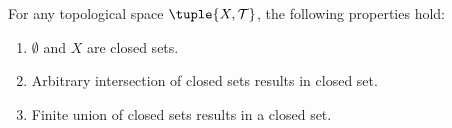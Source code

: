 \begin{thm}
     \label{thm:topological-space-properties-of-closed-sets}
    For any topological space \( \tuple{X, \mathcal{T}} \), the following properties hold:
    \begin{enumerate}[topsep=2pt,label=\textup{\texttt{(\alph*)}}]
        \item \( \emptyset \) and \( X \) are closed sets.  \label{enum:topological-space-properties-of-closed-sets-empty-and-X-are-closed}
        \item Arbitrary intersection of closed sets results in closed set.  \label{enum:topological-space-properties-of-closed-sets-intersection-closed}
        \item Finite union of closed sets results in a closed set.  \label{enum:topological-space-properties-of-closed-sets-finite-union-closed}
    \end{enumerate}
\end{thm}

